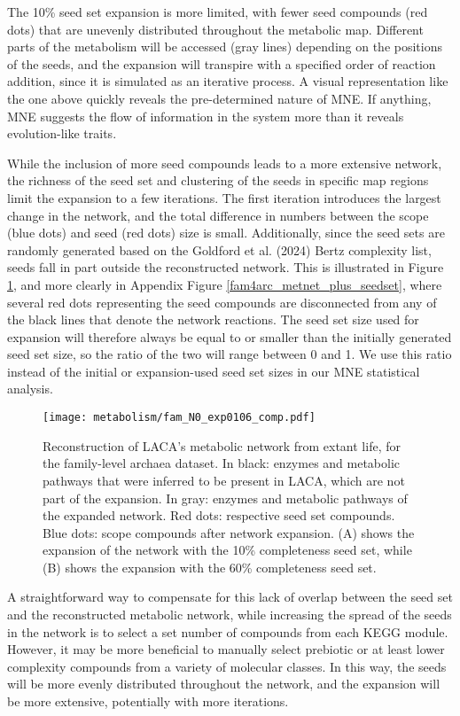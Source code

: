 The 10\% seed set expansion is more limited, with fewer seed compounds (red dots) that are unevenly distributed throughout the metabolic map. Different parts of the metabolism will be accessed (gray lines) depending on the positions of the seeds, and the expansion will transpire with a specified order of reaction addition, since it is simulated as an iterative process. A visual representation like the one above quickly reveals the pre-determined nature of MNE. If anything, MNE suggests the flow of information in the system more than it reveals evolution-like traits.

While the inclusion of more seed compounds leads to a more extensive network, the richness of the seed set and clustering of the seeds in specific map regions limit the expansion to a few iterations. The first iteration introduces the largest change in the network, and the total difference in numbers between the scope (blue dots) and seed (red dots) size is small. Additionally, since the seed sets are randomly generated based on the Goldford et al. (2024) \cite{goldford2024} Bertz complexity list, seeds fall in part outside the reconstructed network. This is illustrated in Figure \ref{fam4arc_metnetexp_0106}, and more clearly in Appendix Figure \ref{fam4arc_metnet_plus_seedset}, where several red dots representing the seed compounds are disconnected from any of the black lines that denote the network reactions. The seed set size used for expansion will therefore always be equal to or smaller than the initially generated seed set size, so the ratio of the two will range between 0 and 1. We use this ratio instead of the initial or expansion-used seed set sizes in our MNE statistical analysis.

\begin{figure}[H]
    \centering
    \texttt{[image: metabolism/fam\_N0\_exp0106\_comp.pdf]}
    \caption{Reconstruction of LACA's metabolic network from extant life, for the family-level archaea dataset. In black: enzymes and metabolic pathways that were inferred to be present in LACA, which are not part of the expansion. In gray: enzymes and metabolic pathways of the expanded network. Red dots: respective seed set compounds. Blue dots: scope compounds after network expansion. (A) shows the expansion of the network with the 10\% completeness seed set, while (B) shows the expansion with the 60\% completeness seed set.}    
    \label{fam4arc_metnetexp_0106}
\end{figure}

A straightforward way to compensate for this lack of overlap between the seed set and the reconstructed metabolic network, while increasing the spread of the seeds in the network is to select a set number of compounds from each KEGG module. However, it may be more beneficial to manually select prebiotic or at least lower complexity compounds from a variety of molecular classes. In this way, the seeds will be more evenly distributed throughout the network, and the expansion will be more extensive, potentially with more iterations.




